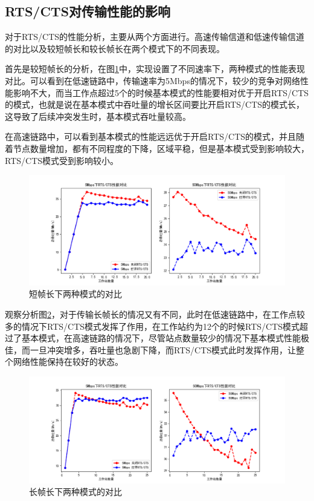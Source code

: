 \documentclass{article}
\begin{document}
\subsection{RTS/CTS对传输性能的影响}

对于RTS/CTS的性能分析，主要从两个方面进行。高速传输信道和低速传输信道的对比以及较短帧长和较长帧长在两个模式下的不同表现。

首先是较短帧长的分析，在图\ref{fig:RTS_CTS_shortpacketLen}中，实现设置了不同速率下，两种模式的性能表现对比。可以看到在低速链路中，传输速率为5Mbps的情况下，较少的竞争对网络性能影响不大，而当工作点超过5个的时候基本模式的性能要相对优于开启RTS/CTS的模式，也就是说在基本模式中吞吐量的增长区间要比开启RTS/CTS的模式长，这导致了后续冲突发生时，基本模式吞吐量较高。

在高速链路中，可以看到基本模式的性能远远优于开启RTS/CTS的模式，并且随着节点数量增加，都有不同程度的下降，区域平稳，但是基本模式受到影响较大，RTS/CTS模式受到影响较小。

\begin{figure}[ht]
	\centering
	\includegraphics[scale=0.6]{picture/RTS_CTS_shortpacketLen.png}
	\caption{短帧长下两种模式的对比}
	\label{fig:RTS_CTS_shortpacketLen}
\end{figure}

观察分析图\ref{fig:RTS_CTS_longpacketLen}，对于传输长帧长的情况又有不同，此时在低速链路中，在工作点较多的情况下RTS/CTS模式发挥了作用，在工作站约为12个的时候RTS/CTS模式超过了基本模式，在高速链路的情况下，尽管站点数量较少的情况下基本模式性能极佳，而一旦冲突增多，吞吐量也急剧下降，而RTS/CTS模式此时发挥作用，让整个网络性能保持在较好的状态。

\begin{figure}[ht]
	\centering
	\includegraphics[scale=0.6]{picture/RTS_CTS_longpacketLen.png}
	\caption{长帧长下两种模式的对比}
	\label{fig:RTS_CTS_longpacketLen}
\end{figure}
\end{document}
